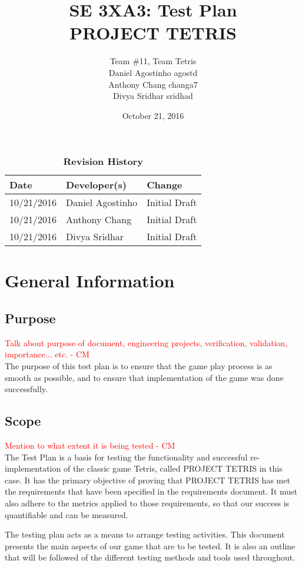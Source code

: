 \documentclass[12pt, titlepage]{article}
\title{SE 3XA3: Test Plan\\PROJECT TETRIS}
\author{Team \#11, Team Tetris
		\\ Daniel Agostinho agostd
		\\ Anthony Chang changa7
		\\ Divya Sridhar sridhad
}
\date{October 21, 2016}
\begin{document}
\maketitle
{}
\tableofcontents
\listoftables
\listoffigures

\begin{table}[bp]
\caption{\bf Revision History}
\begin{tabularx}{\textwidth}{llX}
\toprule
\textbf{Date} & \textbf{Developer(s)} & \textbf{Change}\\
\midrule
10/21/2016 & Daniel Agostinho & Initial Draft\\
10/21/2016 & Anthony Chang & Initial Draft\\
10/21/2016 & Divya Sridhar & Initial Draft\\
\bottomrule
\end{tabularx}
\end{table}

\newpage
{}
\section{General Information}
\subsection{Purpose}
\textcolor{red}{Talk about purpose of document, engineering projects, verification, validation, importance...  etc. - CM} \\
The purpose of this test plan is to ensure that the game play process is as smooth as possible, and to ensure that implementation of the game was done successfully.
\subsection{Scope}
\textcolor{red}{Mention to what extent it is being tested - CM} \\
The Test Plan is a basis for testing the functionality and successful re-implementation of the classic game Tetris, called PROJECT TETRIS in this case. It has the primary objective of proving that PROJECT TETRIS has met the requirements that have been specified in the requirements document. It must also adhere to the metrics applied to those requirements, so that our success is quantifiable and can be measured.

The testing plan acts as a means to arrange testing activities. This document presents the main aspects of our game that are to be tested. It is also an outline that will be followed of the different testing methods and tools used throughout.
\end{document}
